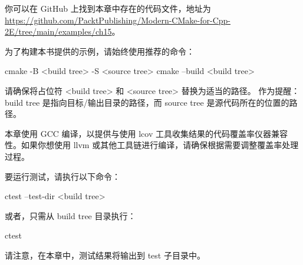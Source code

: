 你可以在 GitHub 上找到本章中存在的代码文件，地址为 \url{https://github.com/PacktPublishing/Modern-CMake-for-Cpp-2E/tree/main/examples/ch15}。

为了构建本书提供的示例，请始终使用推荐的命令：

\begin{shell}
cmake -B <build tree> -S <source tree>
cmake --build <build tree>
\end{shell}

请确保将占位符 <build tree> 和 <source tree> 替换为适当的路径。
作为提醒：build tree 是指向目标/输出目录的路径，而 source tree 是源代码所在的位置的路径。

本章使用 GCC 编译，以提供与使用 lcov 工具收集结果的代码覆盖率仪器兼容性。如果你想使用 llvm 或其他工具链进行编译，请确保根据需要调整覆盖率处理过程。

要运行测试，请执行以下命令：

\begin{shell}
ctest --test-dir <build tree>
\end{shell}

或者，只需从 build tree 目录执行：

\begin{shell}
ctest
\end{shell}

请注意，在本章中，测试结果将输出到 test 子目录中。
















